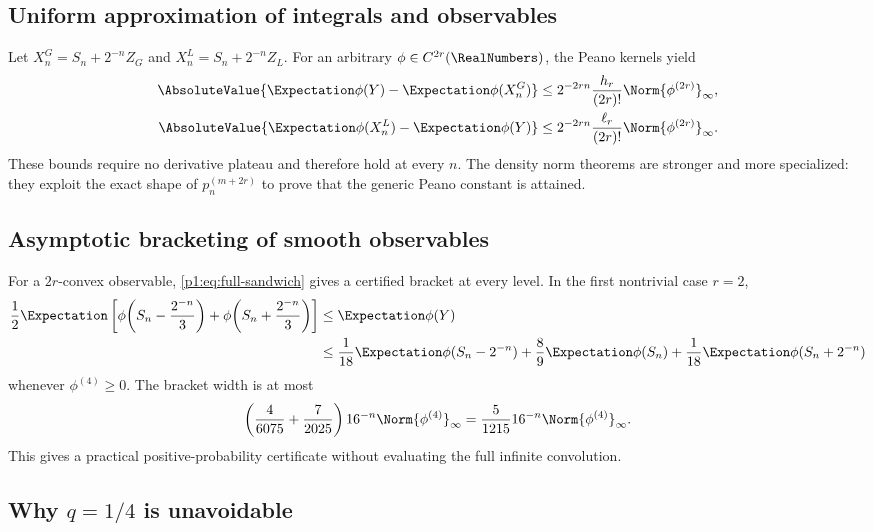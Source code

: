 \documentclass[11pt]{article}
\numberwithin{equation}{section}
\theoremstyle{definition}
\theoremstyle{remark}
\begin{document}
\subsection{Uniform approximation of integrals and observables}

Let $X_n^G=S_n+2^{-n}Z_G$ and $X_n^L=S_n+2^{-n}Z_L$.  For an arbitrary $\phi\in C^{2r}(\RealNumbers)$, the Peano kernels yield
\begin{align}
 \AbsoluteValue{\Expectation\phi(Y)-\Expectation\phi(X_n^G)}
 &\le 2^{-2rn}\frac{h_r}{(2r)!}\Norm{\phi^{(2r)}}_\infty,
 \label{p1:eq:weak-G-full}\\
 \AbsoluteValue{\Expectation\phi(X_n^L)-\Expectation\phi(Y)}
 &\le 2^{-2rn}\frac{\ell_r}{(2r)!}\Norm{\phi^{(2r)}}_\infty.
 \label{p1:eq:weak-L-full}
\end{align}
These bounds require no derivative plateau and therefore hold at every $n$.  The density norm theorems are stronger and more specialized: they exploit the exact shape of $p_n^{(m+2r)}$ to prove that the generic Peano constant is attained.

\subsection{Asymptotic bracketing of smooth observables}

For a $2r$-convex observable, \eqref{p1:eq:full-sandwich} gives a certified bracket at every level.  In the first nontrivial case $r=2$,
\begin{align}
 \frac12\Expectation\left[
 \phi\!\left(S_n-\frac{2^{-n}}3\right)
 +\phi\!\left(S_n+\frac{2^{-n}}3\right)
 \right]
 &\le \Expectation\phi(Y)\nonumber\\
 &\le
 \frac1{18}\Expectation\phi(S_n-2^{-n})
 +\frac89\Expectation\phi(S_n)
 +\frac1{18}\Expectation\phi(S_n+2^{-n})
 \label{p1:eq:r2-observable-bracket}
\end{align}
whenever $\phi^{(4)}\ge0$.  The bracket width is at most
\begin{equation}
 \left(\frac4{6075}+\frac7{2025}\right)16^{-n}
 \Norm{\phi^{(4)}}_\infty
 =\frac5{1215}16^{-n}\Norm{\phi^{(4)}}_\infty.
 \label{p1:eq:r2-bracket-width}
\end{equation}
This gives a practical positive-probability certificate without evaluating the full infinite convolution.

\subsection{Why $q=1/4$ is unavoidable}
\end{document}

